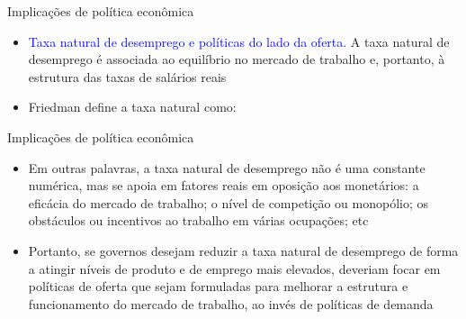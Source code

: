 \documentclass[10pt]{beamer}
\begin{document}
\begin{frame}{Implicações de política econômica}
    \begin{itemize}
        \item \textcolor{blue}{Taxa natural de desemprego e políticas do lado da oferta}. A taxa natural de desemprego é associada ao equilíbrio no mercado de trabalho e, portanto, à estrutura das taxas de salários reais
        \bigskip
        \item Friedman define a taxa natural como:
    \end{itemize}    
\end{frame}

\begin{frame}{Implicações de política econômica}
    \begin{itemize}
        \item Em outras palavras, a taxa natural de desemprego não é uma constante numérica, mas se apoia em fatores reais em oposição aos monetários: a eficácia do mercado de trabalho; o nível de competição ou monopólio; os obstáculos ou incentivos ao trabalho em várias ocupações; etc
        \bigskip
        \item Portanto, se governos desejam reduzir a taxa natural de desemprego de forma a atingir níveis de produto e de emprego mais elevados, deveriam focar em políticas de oferta que sejam formuladas para melhorar a estrutura e funcionamento do mercado de trabalho, ao invés de políticas de demanda
    \end{itemize}    
\end{frame}
\end{document}
